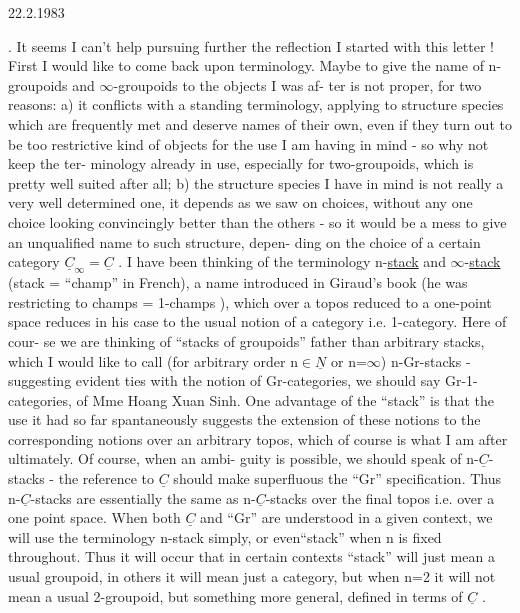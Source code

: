 
 22.2.1983

. It seems I can't help pursuing further the reflection I started with
this letter ! First I would like to come back upon terminology. Maybe
to give the name of n-groupoids and $\infty$-groupoids to the objects I was af-%
ter is not proper, for two reasons: a) it conflicts with a standing
terminology, applying to structure species which are frequently met and
deserve names of their own, even if they turn out to be too restrictive
kind of objects for the use I am having in mind - so why not keep the ter-%
minology already in use, especially for two-groupoids, which is
pretty well suited after all; b) the structure species I have in mind
is not really a very well determined one, it depends as we saw on choices,
without any one choice looking convincingly better than the others - so
it would be a mess to give an unqualified name to such structure, depen-%
ding on the choice of a certain category $\underline{C}_{\infty} = \underline{C}$ . I have been thinking
of the terminology n-\uline{stack} and $\infty$-\uline{stack} (stack = ``champ'' in French),
a name introduced in Giraud's book (he was restricting to champs =
1-champs ), which over a topos reduced to a one-point space reduces in
his case to the usual notion of a category i.e. 1-category. Here of cour-%
se we are thinking of ``stacks of groupoids'' father than arbitrary stacks,
which I would like to call (for arbitrary order n$\in\underline{N}$ or n=$\infty$) n-Gr-stacks
- suggesting evident ties with the notion of Gr-categories, we should
say Gr-1-categories, of Mme Hoang Xuan Sinh. One advantage of the 
``stack'' is that the use it had so far spantaneously suggests the extension
of these notions to the corresponding notions over an arbitrary topos,
which of course is what I am after ultimately. Of course, when an ambi-%
guity is possible, we should speak of  n-$\underline{C}$-stacks - the reference to
$\underline{C}$ should make superfluous the ``Gr'' specification. Thus n-$\underline{C}$-stacks are
essentially the same as n-$\underline{C}$-stacks over the final topos i.e. over a one
point space. When both $\underline{C}$ and ``Gr'' are understood in a given context, we
will use the  terminology n-stack simply, or even``stack''
when n is fixed throughout. Thus it will occur that in certain contexts
``stack'' will just mean a usual groupoid,  in others it
will mean just a category,  but when n=2 it will not mean
a usual 2-groupoid, but something more general, defined in terms of $\underline{C}$ .

